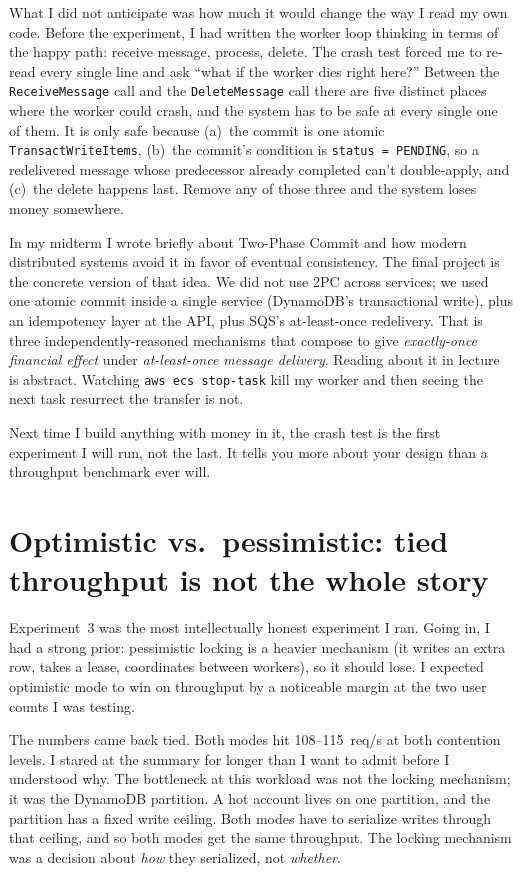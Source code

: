\documentclass[11pt,a4paper]{article}
\begin{document}
What I did not anticipate was how much it would change the way I read my own code. Before the experiment, I had written the worker loop thinking in terms of the happy path: receive message, process, delete. The crash test forced me to re-read every single line and ask ``what if the worker dies right here?'' Between the \texttt{ReceiveMessage} call and the \texttt{DeleteMessage} call there are five distinct places where the worker could crash, and the system has to be safe at every single one of them. It is only safe because (a)~the commit is one atomic \texttt{TransactWriteItems}, (b)~the commit's condition is \texttt{status = PENDING}, so a redelivered message whose predecessor already completed can't double-apply, and (c)~the delete happens last. Remove any of those three and the system loses money somewhere.

\begin{insightbox}
In my midterm I wrote briefly about Two-Phase Commit and how modern distributed systems avoid it in favor of eventual consistency. The final project is the concrete version of that idea. We did not use 2PC across services; we used one atomic commit inside a single service (DynamoDB's transactional write), plus an idempotency layer at the API, plus SQS's at-least-once redelivery. That is three independently-reasoned mechanisms that compose to give \textit{exactly-once financial effect} under \textit{at-least-once message delivery}. Reading about it in lecture is abstract. Watching \texttt{aws ecs stop-task} kill my worker and then seeing the next task resurrect the transfer is not.
\end{insightbox}

Next time I build anything with money in it, the crash test is the first experiment I will run, not the last. It tells you more about your design than a throughput benchmark ever will.

\section{Optimistic vs.\ pessimistic: tied throughput is not the whole story}

Experiment~3 was the most intellectually honest experiment I ran. Going in, I had a strong prior: pessimistic locking is a heavier mechanism (it writes an extra row, takes a lease, coordinates between workers), so it should lose. I expected optimistic mode to win on throughput by a noticeable margin at the two user counts I was testing.

The numbers came back tied. Both modes hit 108--115~req/s at both contention levels. I stared at the summary for longer than I want to admit before I understood why. The bottleneck at this workload was not the locking mechanism; it was the DynamoDB partition. A hot account lives on one partition, and the partition has a fixed write ceiling. Both modes have to serialize writes through that ceiling, and so both modes get the same throughput. The locking mechanism was a decision about \textit{how} they serialized, not \textit{whether}.
\end{document}
